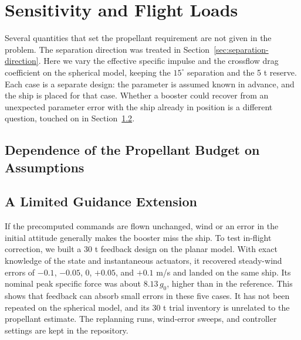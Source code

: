 \section{Sensitivity and Flight Loads}
\label{sec:p3}
Several quantities that set the propellant requirement are not given in the problem. The separation direction was treated in Section~\ref{sec:separation-direction}. Here we vary the effective specific impulse and the crossflow drag coefficient on the spherical model, keeping the $15^\circ$ separation and the 5 t reserve. Each case is a separate design: the parameter is assumed known in advance, and the ship is placed for that case. Whether a booster could recover from an unexpected parameter error with the ship already in position is a different question, touched on in Section~\ref{sec:guidance}.

\subsection{Dependence of the Propellant Budget on Assumptions}





\subsection{A Limited Guidance Extension}
\label{sec:guidance}
If the precomputed commands are flown unchanged, wind or an error in the initial attitude generally makes the booster miss the ship. To test in-flight correction, we built a 30 t feedback design on the planar model. With exact knowledge of the state and instantaneous actuators, it recovered steady-wind errors of $-0.1$, $-0.05$, 0, $+0.05$, and $+0.1$ m/s and landed on the same ship. Its nominal peak specific force was about $8.13\,g_0$, higher than in the reference. This shows that feedback can absorb small errors in these five cases. It has not been repeated on the spherical model, and its 30 t trial inventory is unrelated to the propellant estimate. The replanning runs, wind-error sweeps, and controller settings are kept in the repository.


